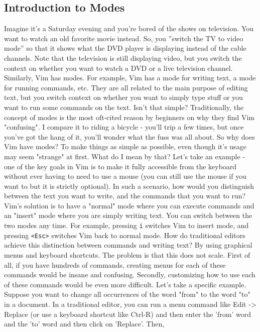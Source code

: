 \subsection{Introduction to Modes} 
Imagine it's a Saturday evening and you're bored of the shows on television.
You want to watch an old favorite
movie instead. So, you ''switch the TV to video mode'' so that it shows what
the DVD player is displaying instead of the cable channels. Note that the
television is still displaying video, but you switch the context on whether you
want to watch a DVD or a live television channel. Similarly, Vim has modes. For
example, Vim has a mode for writing text, a mode for running commands, etc.
They are all related to the main purpose of editing text, but you switch
context on whether you want to simply type stuff or you want to run some
commands on the text. Isn't that simple? Traditionally, the concept of modes is
the most oft-cited reason by beginners on why they find Vim "confusing". I
compare it to riding a bicycle - you'll trip a few times, but once you've got
the hang of it, you'll wonder what the fuss was all about. So why does Vim have
modes? To make things as simple as possible, even though it's usage may seem
"strange" at first. What do I mean by that? Let's take an example - one of the
key goals in Vim is to make it fully accessible from the keyboard without ever
having to need to use a mouse (you can still use the mouse if you want to but
it is strictly optional). In such a scenario, how would you distinguish between
the text you want to write, and the commands that you want to run? Vim's
solution is to have a "normal" mode where you can execute commands and an
"insert" mode where you are simply writing text. You can switch between the two
modes any time. For example, pressing \texttt{i} switches Vim to insert mode,
and pressing \texttt{<Esc>} switches Vim back to normal mode. How do
traditional editors achieve this distinction between commands and writing text?
By using graphical menus and keyboard shortcuts. The problem is that this does
not scale. First of all, if you have hundreds of commands, creating menus for
each of these commands would be insane and confusing. Secondly, customizing how
to use each of these commands would be even more difficult. Let's take a
specific example. Suppose you want to change all occurrences of the word "from"
to the word "to" in a document. In a traditional editor, you can run a menu
command like Edit -> Replace (or use a keyboard shortcut like Ctrl-R) and then
enter the 'from' word and the 'to' word and then click on 'Replace'. Then,
